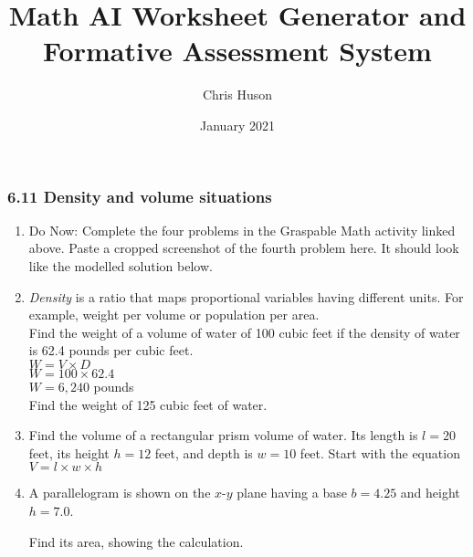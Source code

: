 \documentclass[12pt, twoside]{article}
\title{Math AI Worksheet Generator and Formative Assessment System}
\author{Chris Huson}
\date{January 2021}
\begin{document}
\subsubsection*{6.11 Density and volume situations}
\begin{enumerate}

\item Do Now: Complete the four problems in the Graspable Math activity linked above. Paste a cropped screenshot of the fourth problem here. It should look like the modelled solution below.

\newpage
\item \emph{Density} is a ratio that maps proportional variables having different units. For example, weight per volume or population per area. \\[0.5cm]
Find the weight of a volume of water of 100 cubic feet if the density of water is 62.4 pounds per cubic feet.  \\[0.5cm]
$W=V \times D$\\
$W=100 \times 62.4$\\
$W=6,240$ pounds \\[0.5cm]
Find the weight of 125 cubic feet of water.

\newpage
\item Find the volume of a rectangular prism volume of water. Its length is $l=20$ feet, its height $h=12$ feet, and depth is $w=10$ feet. Start with the equation \\[0.5cm]
$V = l \times w \times h$
  \begin{flushright}
  \end{flushright}
  
\newpage
\item A parallelogram is shown on the $x$-$y$ plane having a base $b=4.25$ and height $h=7.0$. 
  \begin{multicols}{2}
    Find its area, showing the calculation.
      \begin{flushright}
      \end{flushright}
  \end{multicols} 


\end{enumerate}
\end{document}

